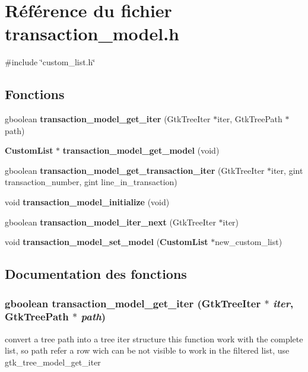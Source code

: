 \section{Référence du fichier transaction\_\-model.h}
\label{transaction__model_8h}
{\ttfamily \#include \char`\"{}custom\_\-list.h\char`\"{}}\par
\subsection*{Fonctions}
\begin{DoxyCompactItemize}
\item 
gboolean {\bf transaction\_\-model\_\-get\_\-iter} (GtkTreeIter $\ast$iter, GtkTreePath $\ast$path)
\item 
{\bf CustomList} $\ast$ {\bf transaction\_\-model\_\-get\_\-model} (void)
\item 
gboolean {\bf transaction\_\-model\_\-get\_\-transaction\_\-iter} (GtkTreeIter $\ast$iter, gint transaction\_\-number, gint line\_\-in\_\-transaction)
\item 
void {\bf transaction\_\-model\_\-initialize} (void)
\item 
gboolean {\bf transaction\_\-model\_\-iter\_\-next} (GtkTreeIter $\ast$iter)
\item 
void {\bf transaction\_\-model\_\-set\_\-model} ({\bf CustomList} $\ast$new\_\-custom\_\-list)
\end{DoxyCompactItemize}


\subsection{Documentation des fonctions}
\subsubsection[{transaction\_\-model\_\-get\_\-iter}]{\setlength{\rightskip}{0pt plus 5cm}gboolean transaction\_\-model\_\-get\_\-iter (GtkTreeIter $\ast$ {\em iter}, \/  GtkTreePath $\ast$ {\em path})}\label{transaction__model_8h_a553ed5bab955a902b0494f0b4521e0fc}
convert a tree path into a tree iter structure this function work with the complete list, so path refer a row wich can be not visible to work in the filtered list, use gtk\_\-tree\_\-model\_\-get\_\-iter


